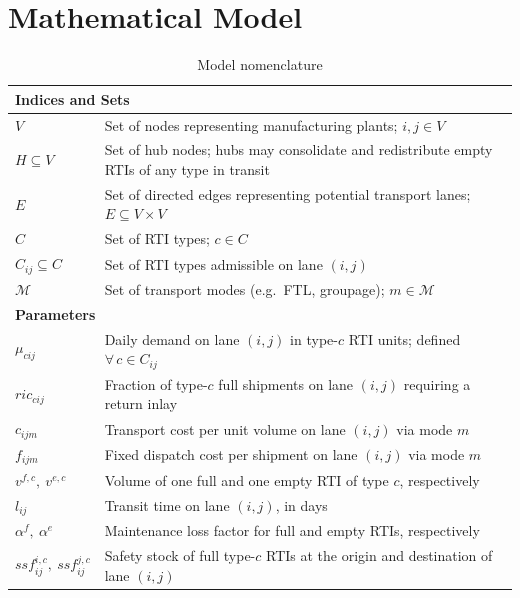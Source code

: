 \section{Mathematical Model}


\begin{longtable}{|p{}|p{}|}
\caption{Model nomenclature}
\label{tab:nomenclature}\\
\hline
\multicolumn{2}{|l|}{\textbf{Indices and Sets}}\\ \hline
$V$
  & Set of nodes representing manufacturing plants; $i, j \in V$ \\
$H \subseteq V$
  & Set of hub nodes; hubs may consolidate and redistribute empty
    RTIs of any type in transit \\
$E$
  & Set of directed edges representing potential transport lanes;
    $E \subseteq V \times V$ \\
$C$
  & Set of RTI types; $c \in C$ \\
$C_{ij} \subseteq C$
  & Set of RTI types admissible on lane $(i,j)$ \\
$\mathcal{M}$
  & Set of transport modes (e.g.\ FTL, groupage); $m \in \mathcal{M}$ \\
\hline
\multicolumn{2}{|l|}{\textbf{Parameters}}\\ \hline
$\mu_{cij}$
  & Daily demand on lane $(i,j)$ in type-$c$ RTI units;
    defined $\forall\,c \in C_{ij}$ \\
$ric_{cij}$
  & Fraction of type-$c$ full shipments on lane $(i,j)$ requiring
    a return inlay \\
$c_{ijm}$
  & Transport cost per unit volume on lane $(i,j)$ via mode $m$ \\
$f_{ijm}$
  & Fixed dispatch cost per shipment on lane $(i,j)$ via mode $m$ \\
$v^{f,c},\ v^{e,c}$
  & Volume of one full and one empty RTI of type $c$,
    respectively \\
$l_{ij}$
  & Transit time on lane $(i,j)$, in days \\
$\alpha^{f},\ \alpha^{e}$
  & Maintenance loss factor for full and empty RTIs, respectively \\
$ssf^{i,c}_{ij},\ ssf^{j,c}_{ij}$
  & Safety stock of full type-$c$ RTIs at the origin and
    destination of lane $(i,j)$ \\

\end{longtable}
